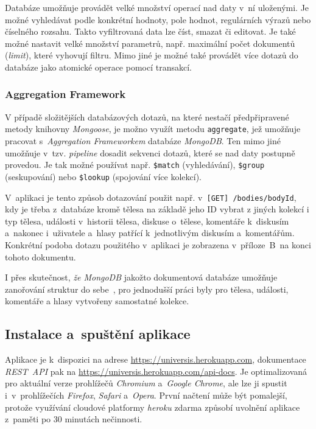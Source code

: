 \documentclass[a4paper,12pt]{article}
\def\code#1{\texttt{#1}}
\begin{document}
Databáze umožňuje provádět velké množství operací nad daty v~ní uloženými. Je možné vyhledávat podle konkrétní hodnoty, pole hodnot, regulárních výrazů nebo číselného rozsahu. Takto vyfiltrovaná data lze číst, smazat či editovat. Je také možné nastavit velké množství parametrů, např. maximální počet dokumentů (\textit{limit}), které vyhovují filtru. Mimo jiné je možné také provádět více dotazů do databáze jako atomické operace pomocí transakcí.~\cite{nodebook}



\vspace*{-0.5cm}
\subsubsection{Aggregation Framework}

V případě složitějších databázových dotazů, na které nestačí předpřipravené metody knihovny \textit{Mongoose}, je možno využít metodu \code{aggregate}, jež umožňuje pracovat s~\textit{Aggregation Frameworkem} databáze \textit{MongoDB}. Ten mimo jiné umožňuje v~tzv. \textit{pipeline} dosadit sekvenci dotazů, které se nad daty postupně provedou. Je tak možné používat např. \code{\$match} (vyhledávání), \code {\$group} (seskupování) nebo \code{\$lookup} (spojování více kolekcí).~\cite{aggregation}

V~aplikaci je tento způsob dotazování použit např. v~\code{[GET] /bodies/{bodyId}}, kdy je třeba z~databáze kromě tělesa na základě jeho ID vybrat z jiných kolekcí i typ tělesa, události v~historii tělesa, diskuse o~tělese, komentáře k~diskusím a~nakonec i~uživatele a~hlasy patřící k~jednotlivým diskusím a~komentářům. Konkrétní podoba dotazu použitého v~aplikaci je zobrazena v~příloze~B~na konci tohoto dokumentu.

I přes skutečnost, \textit{že MongoDB} jakožto dokumentová databáze umožňuje zanořování struktur do sebe~\cite{mongomongoose}, pro jednodušší práci byly pro tělesa, události, komentáře a hlasy vytvořeny samostatné kolekce.

\subsection{Instalace a~spuštění aplikace}

Aplikace je k~dispozici na adrese \url{https://universis.herokuapp.com}, dokumentace \break\textit{REST~API} pak na \url{https://universis.herokuapp.com/api-docs}. Je optimalizovaná pro aktuální verze prohlížečů \textit{Chromium} a~\textit{Google Chrome}, ale lze ji spustit i~v~prohlížečích \textit{Firefox}, \textit{Safari} a~\textit{Opera}. První načtení může být pomalejší, protože využívání cloudové platformy \textit{heroku} zdarma způsobí uvolnění aplikace z~paměti po 30 minutách nečinnosti. 
\end{document}
